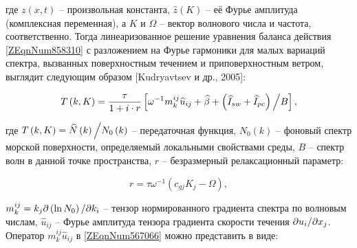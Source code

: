 где $z\left(x,t\right)$ -- произвольная константа, $\widehat{z}\left(K\right)$ -- её Фурье амплитуда (комплексная переменная), а $K$ и $\Omega $ -- вектор волнового числа и частота, соответственно. Тогда линеаризованное решение уравнения баланса действия \eqref{ZEqnNum858310} с разложением на Фурье гармоники для малых вариаций спектра, вызванных поверхностным течением и приповерхностным ветром, выглядит следующим образом [Kudryavtsev и др., 2005]:



\begin{equation} \label{1.37)} T\left(k,K\right)=\frac{\tau }{1+i\cdot r} \left[\omega ^{-1} m_{k}^{ij} \widehat{u}_{ij} +\widehat{\beta }+{\left(\widehat{I}_{sw} +\widehat{I}_{pc} \right)\mathord{\left/ {\vphantom {\left(\widehat{I}_{sw} +\widehat{I}_{pc} \right) B}} \right. \kern-\nulldelimiterspace} B} \right],  \end{equation} 



где $T\left(k,K\right)={\widehat{N}\left(k\right)\mathord{\left/ {\vphantom {\widehat{N}\left(k\right) N_{0} \left(k\right)}} \right. \kern-\nulldelimiterspace} N_{0} \left(k\right)} $ -- передаточная функция, $N_{0} \left(k\right)$ -- фоновый спектр морской поверхности, определяемый локальными свойствами среды, $B$ -- спектр волн в данной точке пространства, $r$ -- безразмерный релаксационный параметр:



\begin{equation} \label{1.38)} r=\tau \omega ^{-1} \left(c_{gj} K_{j} -\Omega \right),  \end{equation} 



$m_{k}^{ij} =k_{j} {\partial \left(\ln N_{0} \right)\mathord{\left/ {\vphantom {\partial \left(\ln N_{0} \right) \partial k_{i} }} \right. \kern-\nulldelimiterspace} \partial k_{i} } $ -- тензор нормированного градиента спектра по волновым числам, $\widehat{u}_{ij} $ -- Фурье амплитуда тензора градиента скорости течения ${\partial u_{i} \mathord{\left/ {\vphantom {\partial u_{i}  \partial x_{j} }} \right. \kern-\nulldelimiterspace} \partial x_{j} } $. Оператор $m_{k}^{ij} \widehat{u}_{ij} $ в \eqref{ZEqnNum567066} можно представить в виде:




